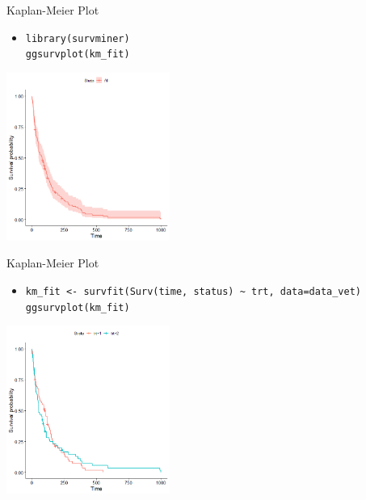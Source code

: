 \documentclass[aspectratio = 169]{chariteBeamer}
\begin{document}
\begin{frame}[fragile]{Kaplan-Meier Plot}
	\begin{itemize}
		\item \verb+library(survminer)+ \\ \verb+ggsurvplot(km_fit)+
	\end{itemize}
			
	\begin{center}
		\includegraphics[height=5.5cm]{KM2}
	\end{center}
\end{frame}

\begin{frame}[fragile]{Kaplan-Meier Plot}
	\begin{itemize}
		\item \verb+km_fit <- survfit(Surv(time, status) ~ trt, data=data_vet)+ \\ \verb+ggsurvplot(km_fit)+
	\end{itemize}
			
	\begin{center}
		\includegraphics[height=5.5cm]{KM3}
	\end{center}
\end{frame}
\end{document}
